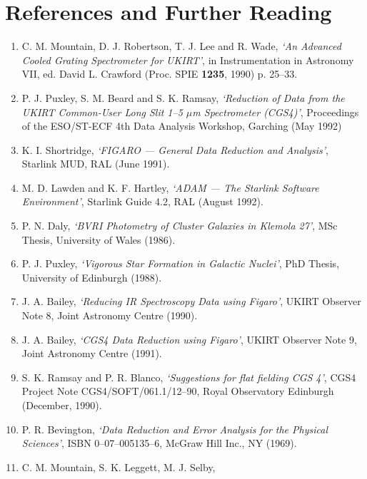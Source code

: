 {\section{References and Further Reading}
\begin{enumerate}
\item C. M. Mountain, D. J. Robertson, T. J. Lee and R. Wade,
     {\em `An Advanced Cooled Grating Spectrometer for UKIRT'},
     in Instrumentation in Astronomy VII, ed. David L. Crawford
     (Proc. SPIE {\bf 1235}, 1990) p. 25--33.              \label{Mountain} 
\item P. J. Puxley, S. M. Beard and S. K. Ramsay,
     {\em `Reduction of Data from the UKIRT Common-User Long Slit 
      1--5 $\mu$m Spectrometer (CGS4)'}, 
      Proceedings of the ESO/ST-ECF 4th Data Analysis Workshop,
      Garching (May 1992)                                  \label{Puxley_1}
\item K. I. Shortridge, 
     {\em `FIGARO --- General Data Reduction and Analysis'},
     Starlink MUD, RAL (June 1991).                        \label{Shortridge} 
\item M. D. Lawden and K. F. Hartley, 
     {\em `ADAM --- The Starlink Software Environment'},
     Starlink Guide 4.2, RAL (August 1992).                \label{Hartley} 
\item P. N. Daly,
     {\em `BVRI Photometry of Cluster Galaxies in Klemola 27'},
     MSc Thesis, University of Wales (1986).               \label{Daly}
\item P. J. Puxley, 
     {\em `Vigorous Star Formation in Galactic Nuclei'},
     PhD Thesis, University of Edinburgh (1988).           \label{Puxley_2} 
\item J. A. Bailey, 
     {\em `Reducing IR Spectroscopy Data using Figaro'},
     UKIRT Observer Note 8, Joint Astronomy Centre (1990). \label{Bailey_1} 
\item J. A. Bailey,  
     {\em `CGS4 Data Reduction using Figaro'},
     UKIRT Observer Note 9, Joint Astronomy Centre (1991). \label{Bailey_2} 
\item S. K. Ramsay and P. R. Blanco,
     {\em `Suggestions for flat fielding CGS 4'},
      CGS4 Project Note CGS4/SOFT/061.1/12--90, 
      Royal Observatory Edinburgh (December, 1990).        \label{Ramsay}
\item P. R. Bevington, 
     {\em `Data Reduction and Error Analysis for the Physical Sciences'},
      ISBN 0--07--005135--6, McGraw Hill Inc., NY (1969).  \label{Bevington} 
\item C. M. Mountain, S. K. Leggett, M. J. Selby, 

\end{enumerate}}
